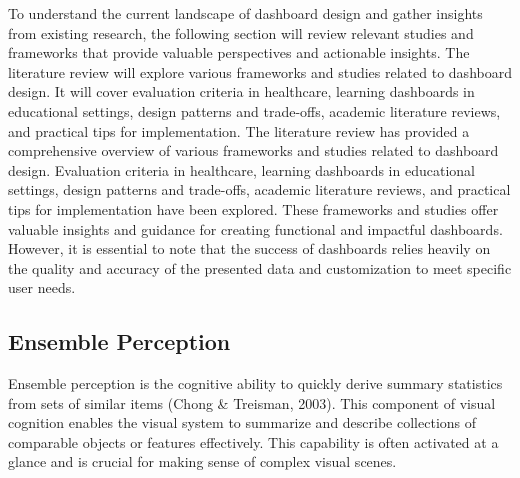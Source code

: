 \documentclass[print]{nuthesis}
\begin{document}
To understand the current landscape of dashboard design and gather insights from existing research, the following section will review relevant studies and frameworks that provide valuable perspectives and actionable insights. The literature review will explore various frameworks and studies related to dashboard design.
It will cover evaluation criteria in healthcare, learning dashboards in educational settings, design patterns and trade-offs, academic literature reviews, and practical tips for implementation.
The literature review has provided a comprehensive overview of various frameworks and studies related to dashboard design.
Evaluation criteria in healthcare, learning dashboards in educational settings, design patterns and trade-offs, academic literature reviews, and practical tips for implementation have been explored.
These frameworks and studies offer valuable insights and guidance for creating functional and impactful dashboards.
However, it is essential to note that the success of dashboards relies heavily on the quality and accuracy of the presented data and customization to meet specific user needs.

\hypertarget{ensemble-perception}{%
\subsection{Ensemble Perception}\label{ensemble-perception}}

Ensemble perception is the cognitive ability to quickly derive summary statistics from sets of similar items (Chong \& Treisman, 2003).
This component of visual cognition enables the visual system to summarize and describe collections of comparable objects or features effectively.
This capability is often activated at a glance and is crucial for making sense of complex visual scenes.
\end{document}
